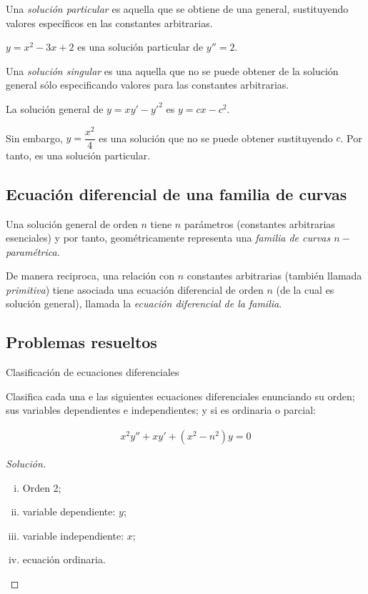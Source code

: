 {}
	Una \emph{solución particular} es aquella que se obtiene de una general, sustituyendo valores específicos en las constantes arbitrarias.

{}
	\begin{exmp}
		\label{exmp 02:08}
		$ y = x^2-3x+2 $ es una solución particular de $ y''=2 $. 
	\end{exmp}


	Una \emph{solución singular} es una aquella que no se puede obtener de la solución general sólo especificando valores para las constantes arbitrarias. 

{}
	\begin{exmp}
		La solución general de $ y = xy'-y'^{2} $ es $ y = cx-c^{2} $. 
		
		 Sin embargo, $ y=\dfrac{x^{2}}{4} $ es una solución que no se puede obtener sustituyendo $ c $.  Por tanto, es una solución particular.
	\end{exmp}

\subsection{Ecuación diferencial de una familia de curvas}
{}
Una solución general de orden $ n $ tiene $ n $ parámetros (constantes arbitrarias esenciales) y por tanto, geométricamente representa una \emph{familia de curvas $n-$paramétrica. }

{}
	De manera reciproca, una relación con $ n $ constantes arbitrarias (también llamada \emph{primitiva}) tiene asociada una ecuación diferencial de orden $n$ (de la cual es solución general), llamada la \emph{ecuación diferencial de la familia}.

\subsection{Problemas resueltos}
{Clasificación de ecuaciones diferenciales}
\begin{solved}
		Clasifica cada una e las siguientes ecuaciones diferenciales enunciando su orden; sus variables dependientes e independientes; y si es ordinaria o parcial:	
\end{solved}

{}
		\begin{align}
		x^2y''+xy'+\left(x^2-n^2\right)y = 0
		\end{align} 
\begin{proof}[Solución]
	\begin{enumerate}[(i)]
		\item Orden 2;
		\item variable dependiente: $ y $;
		\item variable independiente: $ x $; 
		\item ecuación ordinaria.
	\end{enumerate}
\end{proof}

